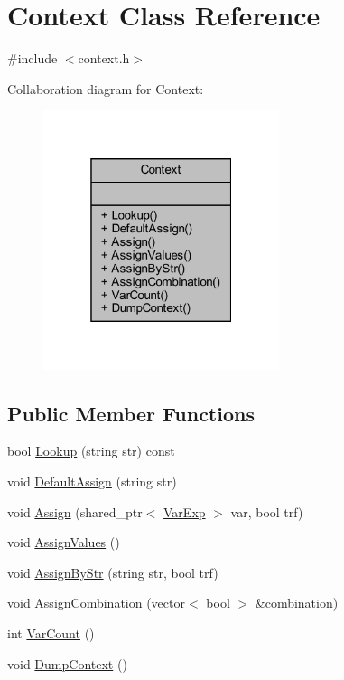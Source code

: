 \hypertarget{classContext}{}\section{Context Class Reference}
\label{classContext}


{\ttfamily \#include $<$context.\+h$>$}



Collaboration diagram for Context\+:
\nopagebreak
\begin{figure}[H]
\begin{center}
\leavevmode
\includegraphics[width=196pt]{classContext__coll__graph}
\end{center}
\end{figure}
\subsection*{Public Member Functions}
\begin{DoxyCompactItemize}
\item 
bool \mbox{\hyperlink{classContext_adb549e858c14fd20ea21d12df224034b}{Lookup}} (string str) const
\item 
void \mbox{\hyperlink{classContext_abbc623520a3b4ec31c55ade44fddc953}{Default\+Assign}} (string str)
\item 
void \mbox{\hyperlink{classContext_a223eb7768e091ed328ac50cd7955a198}{Assign}} (shared\+\_\+ptr$<$ \mbox{\hyperlink{classVarExp}{Var\+Exp}} $>$ var, bool trf)
\item 
void \mbox{\hyperlink{classContext_a45f69da87ee7bc8843f6f99808e6686e}{Assign\+Values}} ()
\item 
void \mbox{\hyperlink{classContext_aa7bdd4c9b4aa512ac7d08dd58f5e13c0}{Assign\+By\+Str}} (string str, bool trf)
\item 
void \mbox{\hyperlink{classContext_abec0d3806d24c62690deb56803a70712}{Assign\+Combination}} (vector$<$ bool $>$ \&combination)
\item 
int \mbox{\hyperlink{classContext_a548788d37239de4a5e8a85a128c9a570}{Var\+Count}} ()
\item 
void \mbox{\hyperlink{classContext_ab61f6ccce5943b4aab6dac8cfdc9513c}{Dump\+Context}} ()
\end{DoxyCompactItemize}


